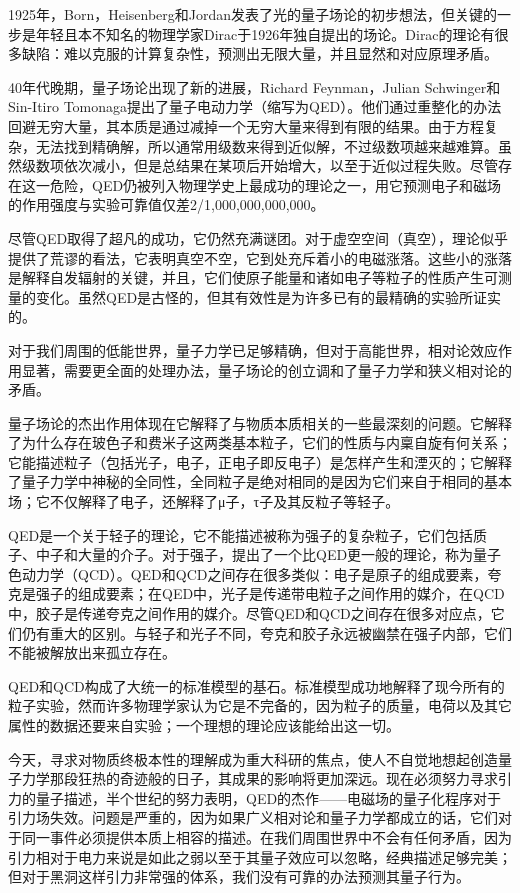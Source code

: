\documentclass[13pt,a4paper]{article}
\begin{document}
\begin{CJK}{UTF8}{song}
1925年，Born，Heisenberg和Jordan发表了光的量子场论的初步想法，但关键的一步是年轻且本不知名的物理学家Dirac于1926年独自提出的场论。Dirac的理论有很多缺陷：难以克服的计算复杂性，预测出无限大量，并且显然和对应原理矛盾。

40年代晚期，量子场论出现了新的进展，Richard Feynman，Julian Schwinger和Sin-Itiro Tomonaga提出了量子电动力学（缩写为QED）。他们通过重整化的办法回避无穷大量，其本质是通过减掉一个无穷大量来得到有限的结果。由于方程复杂，无法找到精确解，所以通常用级数来得到近似解，不过级数项越来越难算。虽然级数项依次减小，但是总结果在某项后开始增大，以至于近似过程失败。尽管存在这一危险，QED仍被列入物理学史上最成功的理论之一，用它预测电子和磁场的作用强度与实验可靠值仅差2/1,000,000,000,000。

尽管QED取得了超凡的成功，它仍然充满谜团。对于虚空空间（真空），理论似乎提供了荒谬的看法，它表明真空不空，它到处充斥着小的电磁涨落。这些小的涨落是解释自发辐射的关键，并且，它们使原子能量和诸如电子等粒子的性质产生可测量的变化。虽然QED是古怪的，但其有效性是为许多已有的最精确的实验所证实的。

对于我们周围的低能世界，量子力学已足够精确，但对于高能世界，相对论效应作用显著，需要更全面的处理办法，量子场论的创立调和了量子力学和狭义相对论的矛盾。

量子场论的杰出作用体现在它解释了与物质本质相关的一些最深刻的问题。它解释了为什么存在玻色子和费米子这两类基本粒子，它们的性质与内稟自旋有何关系；它能描述粒子（包括光子，电子，正电子即反电子）是怎样产生和湮灭的；它解释了量子力学中神秘的全同性，全同粒子是绝对相同的是因为它们来自于相同的基本场；它不仅解释了电子，还解释了μ子，τ子及其反粒子等轻子。

QED是一个关于轻子的理论，它不能描述被称为强子的复杂粒子，它们包括质子、中子和大量的介子。对于强子，提出了一个比QED更一般的理论，称为量子色动力学（QCD）。QED和QCD之间存在很多类似：电子是原子的组成要素，夸克是强子的组成要素；在QED中，光子是传递带电粒子之间作用的媒介，在QCD中，胶子是传递夸克之间作用的媒介。尽管QED和QCD之间存在很多对应点，它们仍有重大的区别。与轻子和光子不同，夸克和胶子永远被幽禁在强子内部，它们不能被解放出来孤立存在。

QED和QCD构成了大统一的标准模型的基石。标准模型成功地解释了现今所有的粒子实验，然而许多物理学家认为它是不完备的，因为粒子的质量，电荷以及其它属性的数据还要来自实验；一个理想的理论应该能给出这一切。

今天，寻求对物质终极本性的理解成为重大科研的焦点，使人不自觉地想起创造量子力学那段狂热的奇迹般的日子，其成果的影响将更加深远。现在必须努力寻求引力的量子描述，半个世纪的努力表明，QED的杰作——电磁场的量子化程序对于引力场失效。问题是严重的，因为如果广义相对论和量子力学都成立的话，它们对于同一事件必须提供本质上相容的描述。在我们周围世界中不会有任何矛盾，因为引力相对于电力来说是如此之弱以至于其量子效应可以忽略，经典描述足够完美；但对于黑洞这样引力非常强的体系，我们没有可靠的办法预测其量子行为。


\end{CJK}
\end{document}
